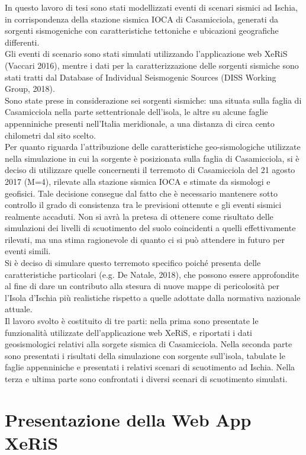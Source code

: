 \documentclass[a4paper,12pt,titlepage]{article}
\begin{document}
In questo lavoro di tesi sono stati modellizzati eventi di scenari sismici ad Ischia, in corrispondenza della stazione sismica IOCA di Casamicciola, generati da sorgenti sismogeniche con caratteristiche tettoniche e ubicazioni geografiche differenti.\\
Gli eventi di scenario sono stati simulati utilizzando l'applicazione web XeRiS (Vaccari 2016), mentre i dati per la caratterizzazione delle sorgenti sismiche
sono stati tratti dal Database of Individual Seismogenic Sources (DISS Working Group, 2018).\\
Sono state prese in considerazione sei sorgenti sismiche: una situata sulla faglia di Casamicciola nella parte settentrionale dell'isola, le altre su alcune faglie appenniniche presenti nell'Italia meridionale, a una distanza di circa cento chilometri dal sito scelto.\\
Per quanto riguarda l'attribuzione delle caratteristiche geo-sismologiche utilizzate nella simulazione in cui la sorgente è posizionata sulla faglia di
Casamicciola, si è deciso di utilizzare quelle concernenti il terremoto di Casamicciola del 21 agosto 2017 (M=4), rilevate alla stazione sismica IOCA e
stimate da sismologi e geofisici. Tale decisione consegue dal fatto che è necessario mantenere sotto controllo il grado di consistenza tra le previsioni
ottenute e gli eventi sismici realmente accaduti. Non si avrà la pretesa di ottenere come risultato delle simulazioni dei livelli di scuotimento del suolo coincidenti a quelli effettivamente rilevati, ma una stima ragionevole di quanto ci si può attendere in futuro per eventi simili.\\
Si è deciso di simulare questo terremoto specifico poiché presenta delle caratteristiche particolari (e.g. De Natale, 2018), che possono essere approfondite al fine di dare un contributo alla stesura di nuove mappe di pericolosità per l'Isola d'Ischia più realistiche rispetto a quelle adottate dalla normativa nazionale attuale.\\
Il lavoro svolto è costituito di tre parti: nella prima sono presentate le funzionalità utilizzate dell'applicazione web XeRiS, e riportati i dati geosismologici relativi alla sorgete sismica di Casamicciola. Nella seconda parte sono presentati i risultati della simulazione con sorgente sull'isola, tabulate le faglie appenniniche e presentati i relativi scenari di scuotimento ad Ischia. Nella terza e ultima parte sono confrontati i diversi scenari di scuotimento simulati.

\section{Presentazione della Web App XeRiS}
\end{document}
